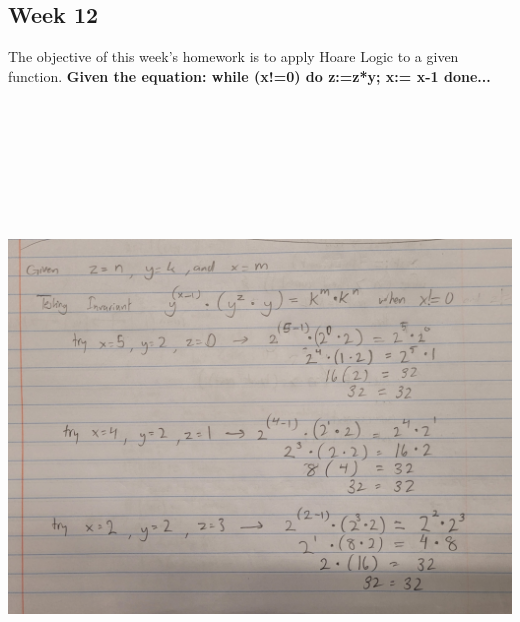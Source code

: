 \documentclass{article}
\theoremstyle{theorem}
\theoremstyle{definition}
\theoremstyle{remark}
\begin{document}
\subsection{Week 12}
The objective of this week's homework is to apply Hoare Logic to a given function.
\textbf{Given the equation: while (x!=0) do z:=z*y;  x:= x-1 done...} \\
\includegraphics[width=18cm, height=18cm]{Report Images/week12_2.jpg}
\\
\end{document}
